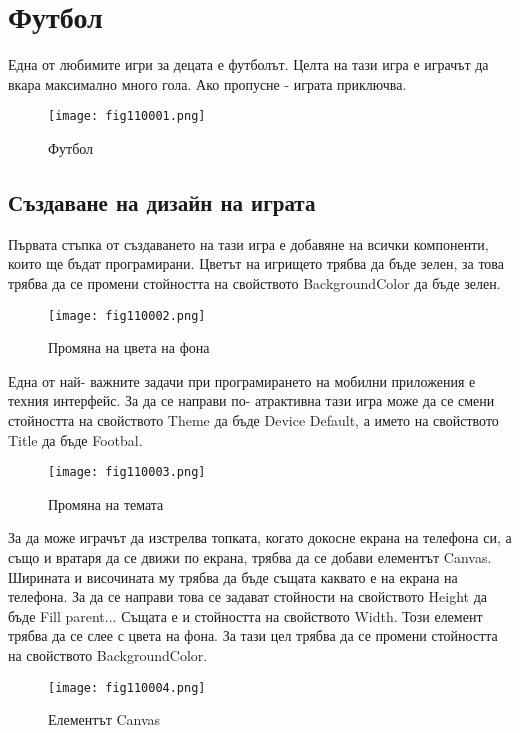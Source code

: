 \chapter{Футбол}

Една от любимите игри за децата е футболът. Целта на тази игра е играчът да вкара максимално много гола. Ако пропусне - играта приключва.

\begin{figure}[H]
  \centering
  \texttt{[image: fig110001.png]}
  \caption{Футбол}
\label{fig110001}
\end{figure}

\section{Създаване на дизайн на играта}
Първата стъпка от създаването на тази игра е добавяне на всички компоненти, които ще бъдат програмирани. Цветът на игрището трябва да бъде зелен, за това трябва да се промени стойността на свойството BackgroundColor да бъде зелен.

\begin{figure}[H]
  \centering
  \texttt{[image: fig110002.png]}
  \caption{Промяна на цвета на фона}
\label{fig110002}
\end{figure}

Една от най- важните задачи при програмирането на мобилни приложения е техния интерфейс. За да се направи по- атрактивна тази игра може да се смени стойността на свойството Theme да бъде Device Default, а името на свойството Title да бъде Footbal.

\begin{figure}[H]
  \centering
  \texttt{[image: fig110003.png]}
  \caption{Промяна на темата}
\label{fig110003}
\end{figure}

За да може играчът да изстрелва топката, когато докосне екрана на телефона си, а също и вратаря да се движи по екрана, трябва да се добави елементът Canvas. Ширината и височината му трябва да бъде същата каквато е на екрана на телефона. За да се направи това се задават стойности на свойството Height да бъде Fill parent... Същата е и стойността на свойството Width. Този елемент трябва да се слее с цвета на фона. За тази цел трябва да се промени стойността на свойството BackgroundColor.

\begin{figure}[H]
  \centering
  \texttt{[image: fig110004.png]}
  \caption{Елементът Canvas}
\label{fig110004}
\end{figure}

